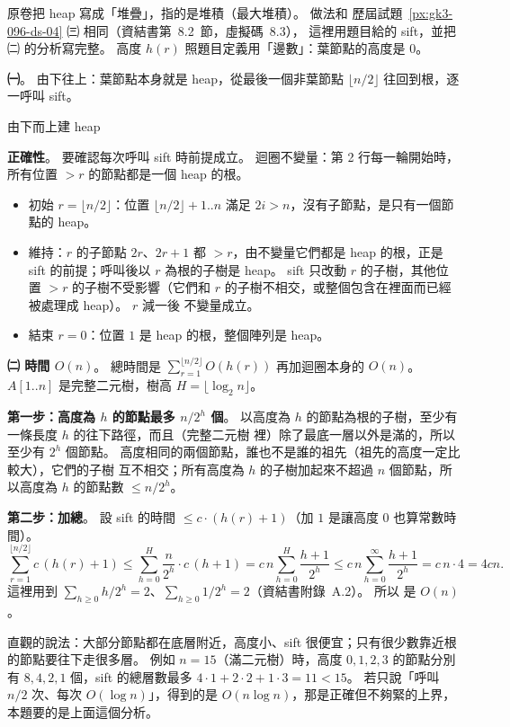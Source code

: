 \begin{pastsoln}
原卷把 heap 寫成「堆疊」，指的是堆積（最大堆積）。 做法和 歷屆試題~\ref{px:gk3-096-ds-04} ㈢ 相同（資結書第~8.2~節，虛擬碼~8.3），
這裡用題目給的 sift，並把 ㈡ 的分析寫完整。 高度 $h(r)$ 照題目定義用「邊數」：葉節點的高度是 $0$。

\textbf{㈠}。 由下往上：葉節點本身就是 heap，從最後一個非葉節點 $\lfloor n/2 \rfloor$ 往回到根，逐一呼叫 sift。
\begin{pseudo}[unbreakable]{由下而上建 heap}
        \State {}
    \EndFor
\EndProcedure
\end{pseudo}
\textbf{正確性}。 要確認每次呼叫 sift 時前提成立。 迴圈不變量：第 2 行每一輪開始時，所有位置 $> r$ 的節點都是一個 heap 的根。
\begin{itemize}
\item 初始 $r = \lfloor n/2 \rfloor$：位置 $\lfloor n/2 \rfloor + 1..n$ 滿足 $2i > n$，沒有子節點，是只有一個節點的 heap。
\item 維持：$r$ 的子節點 $2r$、$2r + 1$ 都 $> r$，由不變量它們都是 heap 的根，正是 sift 的前提；呼叫後以 $r$ 為根的子樹是 heap。
sift 只改動 $r$ 的子樹，其他位置 $> r$ 的子樹不受影響（它們和 $r$ 的子樹不相交，或整個包含在裡面而已經被處理成 heap）。 $r$ 減一後
不變量成立。
\item 結束 $r = 0$：位置 $1$ 是 heap 的根，整個陣列是 heap。
\end{itemize}

\textbf{㈡ 時間 $O(n)$}。 總時間是 $\sum_{r=1}^{\lfloor n/2 \rfloor} O(h(r))$ 再加迴圈本身的 $O(n)$。 $A[1..n]$ 是完整二元樹，樹高
$H = \lfloor \log_2 n \rfloor$。

\textbf{第一步：高度為 $h$ 的節點最多 $n / 2^{h}$ 個}。 以高度為 $h$ 的節點為根的子樹，至少有一條長度 $h$ 的往下路徑，而且（完整二元樹
裡）除了最底一層以外是滿的，所以至少有 $2^{h}$ 個節點。 高度相同的兩個節點，誰也不是誰的祖先（祖先的高度一定比較大），它們的子樹
互不相交；所有高度為 $h$ 的子樹加起來不超過 $n$ 個節點，所以高度為 $h$ 的節點數 $\le n / 2^{h}$。

\textbf{第二步：加總}。 設 sift 的時間 $\le c \cdot (h(r) + 1)$（加 $1$ 是讓高度 $0$ 也算常數時間）。
\[
\sum_{r=1}^{\lfloor n/2 \rfloor} c\,(h(r) + 1) \le \sum_{h=0}^{H} \frac{n}{2^{h}} \cdot c\,(h + 1)
= c\,n \sum_{h=0}^{H} \frac{h + 1}{2^{h}} \le c\,n \sum_{h=0}^{\infty} \frac{h + 1}{2^{h}} = c\,n \cdot 4 = 4cn.
\]
這裡用到 $\sum_{h \ge 0} h / 2^{h} = 2$、$\sum_{h \ge 0} 1/2^{h} = 2$（資結書附錄~A.2）。 所以  是 $O(n)$。

直觀的說法：大部分節點都在底層附近，高度小、sift 很便宜；只有很少數靠近根的節點要往下走很多層。 例如 $n = 15$（滿二元樹）時，高度
$0, 1, 2, 3$ 的節點分別有 $8, 4, 2, 1$ 個，sift 的總層數最多 $4 \cdot 1 + 2 \cdot 2 + 1 \cdot 3 = 11 < 15$。 若只說「呼叫 $n/2$ 次、每次
$O(\log n)$」，得到的是 $O(n \log n)$，那是正確但不夠緊的上界，本題要的是上面這個分析。
\end{pastsoln}
